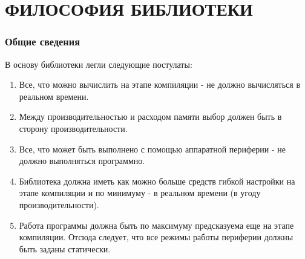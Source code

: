 \chapter{ФИЛОСОФИЯ БИБЛИОТЕКИ}
\subsection{Общие сведения}
В основу библиотеки легли следующие постулаты:
\begin{enumerate}
	\item Все, что можно вычислить на этапе компиляции - не должно вычисляться в реальном времени. 
	\item Между производительностью и расходом памяти выбор должен быть в сторону производительности.
	\item Все, что может быть выполнено с помощью аппаратной периферии - не должно выполняться программно.
	\item Библиотека должна иметь как можно больше средств гибкой настройки на этапе компиляции и по минимуму - в реальном времени (в угоду производительности).
	\item Работа программы должна быть по максимуму предсказуема еще на этапе компиляции. Отсюда следует, что все режимы работы периферии должны быть заданы статически.
\end{enumerate}

